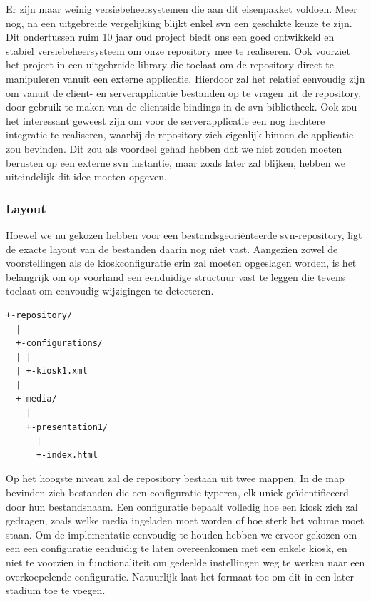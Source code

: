 Er zijn maar weinig versiebeheersystemen die aan dit eisenpakket voldoen. Meer nog, na een uitgebreide vergelijking blijkt enkel \ac{svn} een geschikte keuze te zijn. Dit ondertussen ruim 10 jaar oud project biedt ons een goed ontwikkeld en stabiel versiebeheersysteem om onze repository mee te realiseren. Ook voorziet het project in een uitgebreide library die toelaat om de repository direct te manipuleren vanuit een externe applicatie. Hierdoor zal het relatief eenvoudig zijn om vanuit de client- en serverapplicatie bestanden op te vragen uit de repository, door gebruik te maken van de clientside-bindings in de \ac{svn} bibliotheek. Ook zou het interessant geweest zijn om voor de serverapplicatie een nog hechtere integratie te realiseren, waarbij de repository zich eigenlijk binnen de applicatie zou bevinden. Dit zou als voordeel gehad hebben dat we niet zouden moeten berusten op een externe \ac{svn} instantie, maar zoals later zal blijken, hebben we uiteindelijk dit idee moeten opgeven.

\subsubsection{Layout}

Hoewel we nu gekozen hebben voor een bestandsgeoriënteerde \ac{svn}-repository, ligt de exacte layout van de bestanden daarin nog niet vast. Aangezien zowel de voorstellingen als de kioskconfiguratie erin zal moeten opgeslagen worden, is het belangrijk om op voorhand een eenduidige structuur vast te leggen die tevens toelaat om eenvoudig wijzigingen te detecteren.

\begin{lstlisting}[float, caption=Voorbeeld van een repository layout.]
+-repository/
  |
  +-configurations/
  | |
  | +-kiosk1.xml
  |
  +-media/
    |
    +-presentation1/
      |
      +-index.html
\end{lstlisting}

Op het hoogste niveau zal de repository bestaan uit twee mappen. In de  map bevinden zich bestanden die een configuratie typeren, elk uniek geïdentificeerd door hun bestandsnaam. Een configuratie bepaalt volledig hoe een kiosk zich zal gedragen, zoals welke media ingeladen moet worden of hoe sterk het volume moet staan. Om de implementatie eenvoudig te houden hebben we ervoor gekozen om een een configuratie eenduidig te laten overeenkomen met een enkele kiosk, en niet te voorzien in functionaliteit om gedeelde instellingen weg te werken naar een overkoepelende configuratie. Natuurlijk laat het formaat toe om dit in een later stadium toe te voegen.

